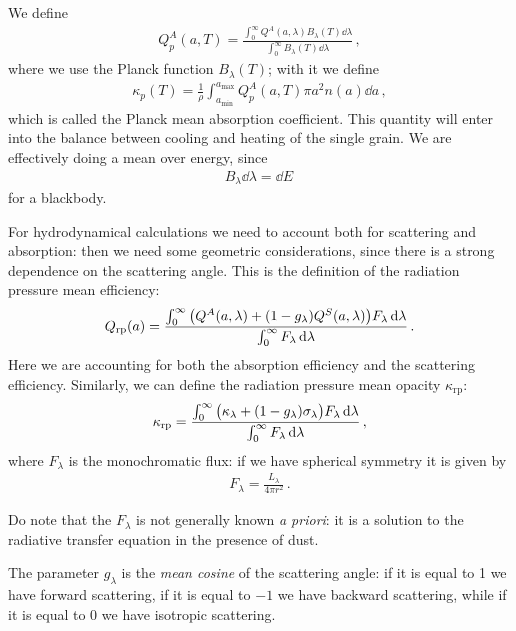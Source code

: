 \documentclass[main.tex]{subfiles}
\begin{document}
We define 
%
\begin{align}
  Q^{A}_{p} (a, T) = \frac{\int_{0}^{ \infty } Q^{A} (a, \lambda ) B_{\lambda } (T) \dd{\lambda }}{\int_{0}^{\infty} B_{\lambda } (T) \dd{\lambda }}
\,,
\end{align}
%
where we use the Planck function \(B_{\lambda }(T)\); with it we define 
%
\begin{align}
  \kappa_{p} (T) = \frac{1}{\rho } \int_{a _{\text{min}}}^{a _{\text{max}}} Q^{A}_{p} (a, T) \pi a^2 n(a) \dd{a}
\,,
\end{align}
%
which is called the Planck mean absorption coefficient. 
This quantity will enter into the balance between cooling and heating of the single grain. We are effectively doing a mean over energy, since 
%
\begin{align}
 B_{\lambda } \dd{\lambda } = \dd{E}
\,
\end{align}
%
for a blackbody. 

For hydrodynamical calculations we need to account both for scattering and absorption: then we need some geometric considerations, since there is a strong dependence on the scattering angle.
This is the definition of the radiation pressure mean efficiency: 
%
\begin{align}
Q _{\text{rp}} (a ) = \frac{\int_{0}^{ \infty  } \qty(Q^{A} (a, \lambda) + (1- g_{\lambda }) Q^{S} (a, \lambda ) ) F_{\lambda } \dd{\lambda }}{\int_{0}^{ \infty } F_{\lambda } \dd{\lambda }}
\,.
\end{align}
%
Here we are accounting for both the absorption efficiency and the scattering efficiency. Similarly, we can define the radiation pressure mean opacity \(\kappa _{\text{rp}}\): 
%
\begin{align}
  \kappa _{\text{rp}} = \frac{\int_{0}^{ \infty  } \qty(\kappa_{\lambda } + (1-g_{\lambda }) \sigma_{\lambda }) F_{\lambda } \dd{\lambda }}{\int_{0}^{ \infty } F_{\lambda } \dd{\lambda }}
\,,
\end{align}
%
where \(F_{\lambda }\) is the monochromatic flux: if we have spherical symmetry it is given by
%
\begin{align}
  F_{\lambda } = \frac{L_{\lambda }}{4 \pi r^2}
  \,.
\end{align}
%

Do note that the \(F_{\lambda }\) is not generally known \emph{a priori}: it is a solution to the radiative transfer equation in the presence of dust.

The parameter \(g_{\lambda }\) is the \emph{mean cosine} of the scattering angle: if it is equal to 1 we have forward scattering, if it is equal to $-1$ we have backward scattering, while if it is equal to 0 we have isotropic scattering. 
\end{document}
